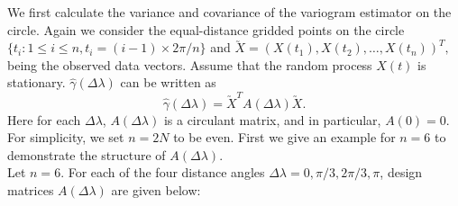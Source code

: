 We first calculate the variance and covariance of the variogram estimator on the circle. Again we consider the equal-distance gridded points on the circle $\{t_i: 1 \le i \le n, t_i = (i-1) \times 2\pi/n\}$ and $\utilde{X} = (X(t_1), X(t_2), \ldots, X(t_n))^T,$ being the observed data vectors. Assume that the random process $X(t)$ is stationary. $\hat{\gamma}(\Delta\lambda)$ can be written as
\[
\hat{\gamma}(\Delta \lambda) = \utilde{X}^T A(\Delta \lambda)\utilde{X}.
\]
Here for each $\Delta \lambda$, $A(\Delta \lambda)$ is a circulant matrix, and in particular, $A(0)= 0$. For simplicity, we set $n = 2N$ to be even. First we give an example for $n = 6$ to demonstrate the structure of $A(\Delta \lambda)$.\\

Let $n = 6$. For each of the four distance angles $\Delta \lambda = 0, \pi/3, 2\pi/3, \pi$, design matrices $A(\Delta \lambda)$ are given below:

